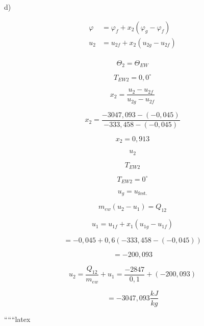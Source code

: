 d)

\begin{align*}
\varphi &= \varphi_f + x_2 (\varphi_g - \varphi_f) \\
u_2 &= u_{2f} + x_2 (u_{2g} - u_{2f}) \\
\end{align*}

\[
\Theta_2 = \Theta_{EW}
\]

\[
T_{EW2} = 0,0^\circ
\]

\[
x_2 = \frac{u_2 - u_{2f}}{u_{2g} - u_{2f}}
\]

\[
x_2 = \frac{-3047,093 - (-0,045)}{-333,458 - (-0,045)}
\]

\[
x_2 = 0,913
\]

\[
u_2
\]

\[
T_{EW2}
\]

\[
T_{EW2} = 0^\circ
\]

\[
u_g = u_{\text{fest.}}
\]

\[
m_{ew}(u_2 - u_1) = Q_{12}
\]

\[
u_1 = u_{1f} + x_1 (u_{1g} - u_{1f})
\]

\[
= -0,045 + 0,6 (-333,458 - (-0,045))
\]

\[
= -200,093
\]

\[
u_2 = \frac{Q_{12}}{m_{ew}} + u_1 = \frac{-2847}{0,1} + (-200,093)
\]

\[
= -3047,093 \frac{kJ}{kg}
\]

``````latex